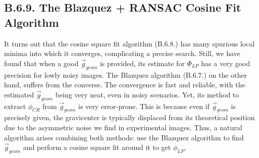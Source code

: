 \documentclass[11pt, a4paper, twoside]{article} %
\begin{document}

\subsection*{B.6.9. The Blazquez + RANSAC Cosine Fit Algorithm}
It turns out that the cosine square fit algorithm (B.6.8.) has many spurious local minima into which it converges, complicating a precise search. Still, we have found that when a good $\vec{g}_{geom}$ is provided, its estimate for $\Phi_{LP}$ has a very good precision for lowly noisy images. The Blazquez algorithm (B.6.7.) on the other hand, suffers from the converse. The convergence is fast and reliable, with the estimated $\vec{g}_{geom}$ being very neat, even in noisy scenarios. Yet, its method to extract $\phi_{CR}$ from $\vec{g}_{geom}$ is very error-prone. This is because even if $\vec{g}_{geom}$ is precisely given, the gravicenter is typically displaced from its theoretical position due to the asymmetric noise we find in experimental images. Thus, a natural algorithm arises combining both methods: use the Blazquez algorithm to find $\vec{g}_{geom}$ and perform a cosine square fit around it to get $\phi_{LP}$.
\end{document}
